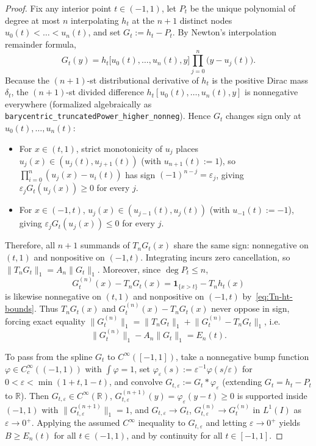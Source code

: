 \documentclass[11pt,a4paper]{article}
\newcommand{\R}{\mathbb{R}}
\newcommand{\Lone}[1]{\lVert #1\rVert_1}
\newcommand{\code}[1]{\nolinkurl{#1}}
\theoremstyle{remark}
\numberwithin{equation}{section}
\begin{document}
\begin{proof}
Fix any interior point $t \in (-1,1)$, let $P_t$ be the unique polynomial of degree at most $n$ interpolating $h_t$ at the $n+1$ distinct nodes $u_0(t) < \dots < u_n(t)$, and set $G_t := h_t - P_t$. By Newton's interpolation remainder formula,
\[
    G_t(y) = h_t\bigl[u_0(t), \dots, u_n(t), y\bigr]\prod_{j=0}^{n}\bigl(y - u_j(t)\bigr).
\]
Because the $(n+1)$-st distributional derivative of $h_t$ is the positive Dirac mass $\delta_t$, the $(n+1)$-st divided difference $h_t[u_0(t), \dots, u_n(t), y]$ is nonnegative everywhere (formalized algebraically as \code{barycentric_truncatedPower_higher_nonneg}). Hence $G_t$ changes sign only at $u_0(t), \dots, u_n(t)$:
\begin{itemize}[leftmargin=1.8em]
    \item For $x \in (t, 1)$, strict monotonicity of $u_j$ places $u_j(x) \in (u_j(t), u_{j+1}(t))$ (with $u_{n+1}(t) := 1$), so $\prod_{i=0}^n (u_j(x) - u_i(t))$ has sign $(-1)^{n-j} = \varepsilon_j$, giving $\varepsilon_j G_t(u_j(x)) \ge 0$ for every $j$.
    \item For $x \in (-1, t)$, $u_j(x) \in (u_{j-1}(t), u_j(t))$ (with $u_{-1}(t) := -1$), giving $\varepsilon_j G_t(u_j(x)) \le 0$ for every $j$.
\end{itemize}
Therefore, all $n+1$ summands of $T_n G_t(x)$ share the same sign: nonnegative on $(t,1)$ and nonpositive on $(-1,t)$. Integrating incurs zero cancellation, so $\Lone{T_n G_t} = A_n \Lone{G_t}$. Moreover, since $\deg P_t \le n$,
\[
    G_t^{(n)}(x) - T_n G_t(x) = \mathbf{1}_{\{x > t\}} - T_n h_t(x)
\]
is likewise nonnegative on $(t,1)$ and nonpositive on $(-1,t)$ by~\eqref{eq:Tn-ht-bounds}. Thus $T_n G_t(x)$ and $G_t^{(n)}(x) - T_n G_t(x)$ never oppose in sign, forcing exact equality $\Lone{G_t^{(n)}} = \Lone{T_n G_t} + \Lone{G_t^{(n)} - T_n G_t}$, i.e.
\begin{equation}
    \Lone{G_t^{(n)}} - A_n\Lone{G_t} = E_n(t).
    \label{eq:Gt-identity}
\end{equation}

To pass from the spline $G_t$ to $C^\infty([-1,1])$, take a nonnegative bump function $\varphi \in C_c^\infty((-1,1))$ with $\int \varphi = 1$, set $\varphi_\varepsilon(s) := \varepsilon^{-1}\varphi(s/\varepsilon)$ for $0 < \varepsilon < \min(1+t, 1-t)$, and convolve $G_{t,\varepsilon} := G_t * \varphi_\varepsilon$ (extending $G_t = h_t - P_t$ to $\R$). Then $G_{t,\varepsilon} \in C^\infty(\R)$, $G_{t,\varepsilon}^{(n+1)}(y) = \varphi_\varepsilon(y - t) \ge 0$ is supported inside $(-1,1)$ with $\Lone{G_{t,\varepsilon}^{(n+1)}} = 1$, and $G_{t,\varepsilon} \to G_t$, $G_{t,\varepsilon}^{(n)} \to G_t^{(n)}$ in $L^1(I)$ as $\varepsilon \to 0^+$. Applying the assumed $C^\infty$ inequality to $G_{t,\varepsilon}$ and letting $\varepsilon \to 0^+$ yields $B \ge E_n(t)$ for all $t \in (-1,1)$, and by continuity for all $t \in [-1,1]$.
\end{proof}
\end{document}
